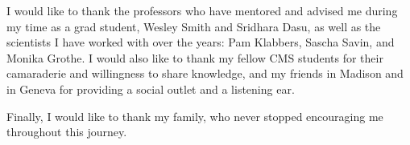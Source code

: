 \begin{acknow}

I would like to thank the professors 
who have mentored and advised me 
during my time as a grad student, 
Wesley Smith and Sridhara Dasu, 
as well as the scientists I have worked with 
over the years: 
Pam Klabbers, Sascha Savin, and Monika Grothe.  
I would also like to thank my fellow CMS students 
for their camaraderie and willingness to share knowledge, 
and my friends in Madison and in Geneva 
for providing a social outlet and a listening ear.  

Finally, I would like to thank my family, 
who never stopped encouraging me 
throughout this journey.  

\end{acknow}
